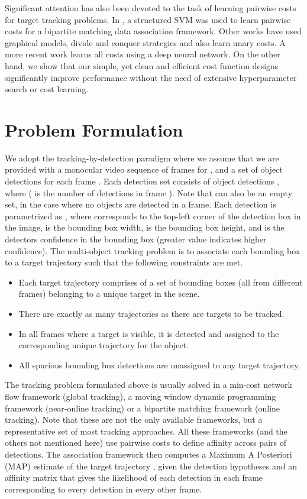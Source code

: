 \documentclass[letterpaper, 10 pt, conference]{ieeeconf}
\begin{document}
Significant attention has also been devoted to the task of learning pairwise costs for target tracking problems. In \cite{ijcv2017}, a structured SVM was used to learn pairwise costs for a bipartite matching data association framework. Other works have used graphical models, divide and conquer strategies and also learn unary costs. A more recent work \cite{DeepNetworkFlow} learns all costs using a deep neural network. On the other hand, we show that our simple, yet clean and efficient cost function designs significantly improve performance without the need of extensive hyperparameter search or cost learning.

\section{Problem Formulation}

We adopt the tracking-by-detection paradigm where we assume that we are provided with a monocular video sequence of  frames  for , and a set of object detections  for each frame . Each detection set consists of object detections , where  ( is the number of detections in frame ). Note that  can also be an empty set, in the case where no objects are detected in a frame. Each detection  is parametrized as , where  corresponds to the top-left corner of the detection box in the image,  is the bounding box width,  is the bounding box height, and  is the detectors confidence in the bounding box (greater value indicates higher confidence). The multi-object tracking problem is to associate each bounding box to a target trajectory  such that the following constraints are met. 
\begin{itemize}
\item Each target trajectory  comprises of a set of bounding boxes (all from different frames) belonging to a unique target in the scene.
\item There are exactly as many trajectories  as there are targets to be tracked.
\item In all frames where a target is visible, it is detected and assigned to the corresponding unique trajectory for the object.
\item All spurious bounding box detections are unassigned to any target trajectory.
\end{itemize}

The tracking problem formulated above is usually solved in a min-cost network flow framework (global tracking), a moving window dynamic programming framework (near-online tracking) or a bipartite matching framework (online tracking). Note that these are not the only available frameworks, but a representative set of most tracking approaches. All these frameworks (and the others not mentioned here) use pairwise costs to define affinity across pairs of detections. The association framework then computes a Maximum A Posteriori (MAP) estimate of the target trajectory , given the detection hypotheses  and an affinity matrix that gives the likelihood of each detection in each frame corresponding to every detection in every other frame.
\end{document}
